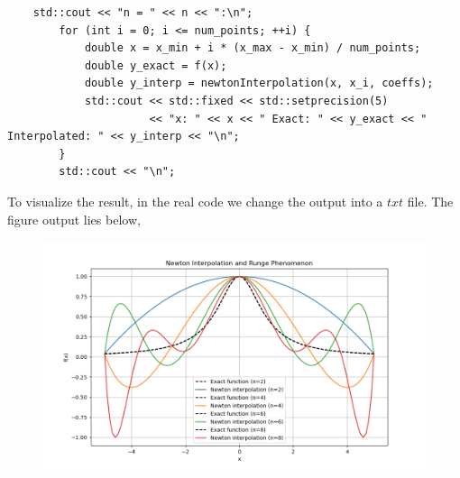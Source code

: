 \documentclass{article}
\begin{document}
\begin{CJK}{UTF8}{gbsn}
\begin{verbatim}
    std::cout << "n = " << n << ":\n";
        for (int i = 0; i <= num_points; ++i) {
            double x = x_min + i * (x_max - x_min) / num_points;
            double y_exact = f(x);
            double y_interp = newtonInterpolation(x, x_i, coeffs);
            std::cout << std::fixed << std::setprecision(5) 
                      << "x: " << x << " Exact: " << y_exact << " Interpolated: " << y_interp << "\n";
        }
        std::cout << "\n";
\end{verbatim}
To visualize the result, in the real code we change the output into a $txt$ file. The figure output lies below,
\begin{figure}[h!]
    \centering
    \includegraphics[width=1\linewidth]{Figure_1.png}
\end{figure}


\end{CJK}
\end{document}
